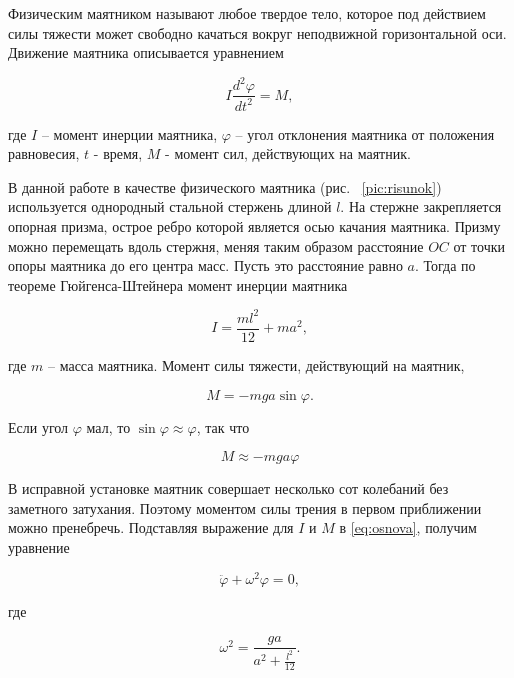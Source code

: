 \documentclass[a4paper, 12pt]{article}
\begin{document}
Физическим маятником называют любое твердое тело, которое под действием силы тяжести может свободно качаться вокруг неподвижной горизонтальной оси. Движение маятника описывается уравнением

\begin{equation}
    I\frac{d^2\varphi}{dt^2}=M,
    \label{eq:osnova}
\end{equation}

\noindent где $ I $ -- момент инерции маятника, $ \varphi $ -- угол отклонения маятника от положения равновесия, $ t $ - время, $ M $ - момент сил, действующих на маятник.

В данной работе в качестве физического маятника (рис.~ \ref{pic:risunok}) используется однородный стальной стержень длиной $ l $. На стержне закрепляется опорная призма, острое ребро которой является осью качания маятника. Призму можно перемещать вдоль стержня, меняя таким образом расстояние $ OC $ от точки опоры маятника до его центра масс. Пусть это расстояние равно $ a $. Тогда по теореме Гюйгенса-Штейнера момент инерции маятника

\begin{equation}
    I=\frac{ml^2}{12}+ma^2,
\end{equation}

\noindent где $ m $ -- масса маятника. Момент силы тяжести, действующий на маятник,

\begin{equation}
    M=-mga\sin\varphi.
\end{equation}

\noindent Если угол $ \varphi $ мал, то $ \sin\varphi\approx\varphi $, так что

\begin{equation}
    M\approx-mga\varphi
\end{equation}

\noindent В исправной установке маятник совершает несколько сот колебаний без заметного затухания. Поэтому моментом силы трения в первом приближении можно пренебречь. Подставляя выражение для $ I $ и $ M $ в \eqref{eq:osnova}, получим уравнение

\begin{equation}
    \ddot{\varphi}+\omega^2\varphi=0,
    \label{eq:phi}
\end{equation}

\noindent где

\begin{equation}
    \omega^2=\frac{ga}{a^2+\frac{l^2}{12}}.
\end{equation}
\end{document}
